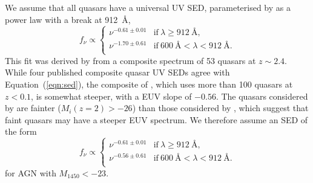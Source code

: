 \documentclass[fleqn,usenatbib]{mnras}
\begin{document}
We assume that all quasars have a universal UV SED, parameterised by
\citet{2015MNRAS.449.4204L} as a power law with a break at 912~{\AA},
\begin{equation}
  f_\nu\propto\begin{cases}
  \nu^{-0.61\pm 0.01} & \text{if}~\lambda\geq 912~\text{\AA},\\
  \nu^{-1.70\pm 0.61} & \text{if}~600~\text{\AA}<\lambda<912~\text{\AA}.\\                
  \end{cases}
  \label{eqn:sed}
\end{equation}
This fit was derived by \citet{2015MNRAS.449.4204L} from a composite
spectrum of 53 quasars at $z\sim 2.4$.  While four published composite
quasar UV SEDs \citep{2002ApJ...565..773T, 2001AJ....122..549V,
  2012ApJ...752..162S, 2014ApJ...794...75S} agree with
Equation~(\ref{eqn:sed}), the composite of
\citet{2004ApJ...615..135S}, which uses more than 100 quasars at
$z<0.1$, is somewhat steeper, with a EUV slope of $-0.56$.  The
quasars considered by \citet{2004ApJ...615..135S} are fainter
($M_i(z=2)>-26$)
than those considered by \citet{2015MNRAS.449.4204L},
which suggest that faint quasars may have a steeper EUV spectrum.  We
therefore assume an SED of the form
\begin{equation}
  f_\nu\propto\begin{cases}
  \nu^{-0.61\pm 0.01} & \text{if}~\lambda\geq 912~\text{\AA},\\
  \nu^{-0.56\pm 0.61} & \text{if}~600~\text{\AA}<\lambda<912~\text{\AA}.\\                
  \end{cases}
  \label{eqn:sed_faint}
\end{equation}
for AGN with $M_{1450}<-23$.
\end{document}
